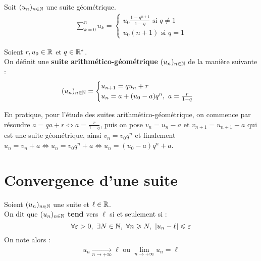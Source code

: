 \begin{proposition}
    Soit $(u_n)_{n \in \mathbb{N}}$ une suite géométrique.
    \begin{align*}
        \sum_{k = 0}^{n} u_k = 
        \begin{cases}
            u_0 \frac{1 - q^{n+1}}{1 - q} \text{ si } q \neq 1\\
            u_0(n+1) \text{ si } q = 1
        \end{cases}
    \end{align*}
\end{proposition}

\begin{definition}
    Soient $r, u_0 \in \mathbb{R}$ et $q \in \mathbb{R}^*$. 
    \\
    On définit une \textbf{suite arithmético-géométrique} $(u_n)_{n \in \mathbb{N}}$ de la manière suivante :
    \begin{align*}
        (u_n)_{n \in \mathbb{N}} = 
        \begin{cases}
            u_{n+1} = qu_n + r \\ 
            u_n = a + (u_0 - a) q^n,\ a = \frac{r}{1 - q}
        \end{cases}
    \end{align*}
\end{definition}

En pratique, pour l'étude des suites arithmético-géométrique, on commence par résoudre $a = qa + r \iff a = \frac{r}{1 - q}$, puis on pose $v_n = u_n - a$ et $v_{n+1} = u_{n+1} - a$ qui est une suite géométrique, ainsi $v_n = v_0 q^n$ et finalement $u_n = v_n + a \iff u_n = v_0 q^n + a \iff u_n = (u_0 - a) q^n + a$.

\section{Convergence d'une suite}
\begin{definition}
    Soient $(u_n)_{n \in \mathbb{N}}$ une suite et $\ell \in \mathbb{R}$. 
    \\
    On dit que $(u_n)_{n \in \mathbb{N}}$ \textbf{tend} vers $\ell$ si et seulement si :
    \[ \forall \varepsilon > 0,\ \exists N \in \mathbb{N},\ \forall n \geqslant N,\ \abs{u_n - \ell} \leqslant \varepsilon \]
    On note alors :
    \begin{align*}
        u_n \xrightarrow[n \to +\infty]{} \ell \text{ ou } \lim_{n \to +\infty} u_n = \ell
    \end{align*}
\end{definition}

